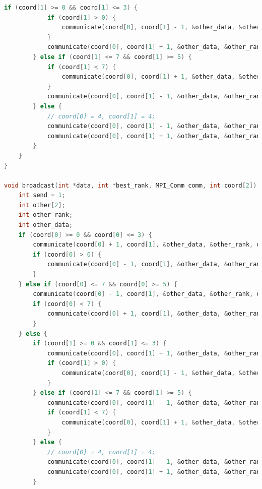 \documentclass[a4paper]{article}
\begin{document}
\begin{lstlisting}[caption=transputer\_matrix.c, label={lst:1}, language=C]
        if (coord[1] >= 0 && coord[1] <= 3) {
            if (coord[1] > 0) {
                communicate(coord[0], coord[1] - 1, &other_data, &other_rank, data, best_rank, !send, comm);
            }
            communicate(coord[0], coord[1] + 1, &other_data, &other_rank, data, best_rank, send, comm);
        } else if (coord[1] <= 7 && coord[1] >= 5) {
            if (coord[1] < 7) {
                communicate(coord[0], coord[1] + 1, &other_data, &other_rank, data, best_rank, !send, comm);
            }
            communicate(coord[0], coord[1] - 1, &other_data, &other_rank, data, best_rank, send, comm);
        } else {
            // coord[0] = 4, coord[1] = 4;
            communicate(coord[0], coord[1] - 1, &other_data, &other_rank, data, best_rank, !send, comm);
            communicate(coord[0], coord[1] + 1, &other_data, &other_rank, data, best_rank, !send, comm);
        }
    }
}

void broadcast(int *data, int *best_rank, MPI_Comm comm, int coord[2]) {
    int send = 1;
    int other[2];
    int other_rank;
    int other_data;
    if (coord[0] >= 0 && coord[0] <= 3) {
        communicate(coord[0] + 1, coord[1], &other_data, &other_rank, data, best_rank, !send, comm);
        if (coord[0] > 0) {
            communicate(coord[0] - 1, coord[1], &other_data, &other_rank, data, best_rank, send, comm);
        }
    } else if (coord[0] <= 7 && coord[0] >= 5) {
        communicate(coord[0] - 1, coord[1], &other_data, &other_rank, data, best_rank, !send, comm);
        if (coord[0] < 7) {
            communicate(coord[0] + 1, coord[1], &other_data, &other_rank, data, best_rank, send, comm);
        }
    } else {
        if (coord[1] >= 0 && coord[1] <= 3) {
            communicate(coord[0], coord[1] + 1, &other_data, &other_rank, data, best_rank, !send, comm);
            if (coord[1] > 0) {
                communicate(coord[0], coord[1] - 1, &other_data, &other_rank, data, best_rank, send, comm);
            }
        } else if (coord[1] <= 7 && coord[1] >= 5) {
            communicate(coord[0], coord[1] - 1, &other_data, &other_rank, data, best_rank, !send, comm);
            if (coord[1] < 7) {
                communicate(coord[0], coord[1] + 1, &other_data, &other_rank, data, best_rank, send, comm);
            }
        } else {
            // coord[0] = 4, coord[1] = 4;
            communicate(coord[0], coord[1] - 1, &other_data, &other_rank, data, best_rank, send, comm);
            communicate(coord[0], coord[1] + 1, &other_data, &other_rank, data, best_rank, send, comm);
        }


\end{lstlisting}
\end{document}
